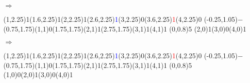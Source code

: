 \documentclass[11pt,a4paper]{article}
\begin{document}
\begin{center}
\begin{table}[ht!]
\begin{minipage}{0.15\textwidth}
  \end{minipage}
  \hfillx
  \begin{minipage}{0.1\textwidth}
  \centering

$ \Rightarrow $

  \end{minipage}
  \hfillx
  \begin{minipage}{0.15\textwidth}

\par\vspace{3\oplineheight}
\oplput(1,2.25){1}\oplput(1.6,2.25){\scriptsize \textcolor{green(htmlcssgreen)}{1}}\oplput(2,2.25){1}\oplput(2.6,2.25){\scriptsize \textcolor{blue}{1}}\oplput(3,2.25){0}\oplput(3.6,2.25){\scriptsize \textcolor{red}{1}}\oplput(4,2.25){0}
\oplput(-0.25,1.05){$-$}
\oplput(0.75,1.75){\tiny \textcolor{green(htmlcssgreen)}{}}\oplput(1,1){0}\oplput(1.75,1.75){\tiny \textcolor{blue}{}}\oplput(2,1){1}\oplput(2.75,1.75){\tiny \textcolor{red}{}}\oplput(3,1){1}\oplput(4,1){1}
\ophline(0,0.8){5}
\oplput(2,0){1}\oplput(3,0){0}\oplput(4,0){1}

  \end{minipage}
  \hfillx
  \begin{minipage}{0.1\textwidth}
  \centering

$ \Rightarrow $

  \end{minipage}
  \hfillx
  \begin{minipage}{0.15\textwidth}

\par\vspace{3\oplineheight}
\oplput(1,2.25){1}\oplput(1.6,2.25){\scriptsize \textcolor{green(htmlcssgreen)}{1}}\oplput(2,2.25){1}\oplput(2.6,2.25){\scriptsize \textcolor{blue}{1}}\oplput(3,2.25){0}\oplput(3.6,2.25){\scriptsize \textcolor{red}{1}}\oplput(4,2.25){0}
\oplput(-0.25,1.05){$-$}
\oplput(0.75,1.75){\tiny \textcolor{green(htmlcssgreen)}{}}\oplput(1,1){0}\oplput(1.75,1.75){\tiny \textcolor{blue}{}}\oplput(2,1){1}\oplput(2.75,1.75){\tiny \textcolor{red}{}}\oplput(3,1){1}\oplput(4,1){1}
\ophline(0,0.8){5}
\oplput(1,0){0}\oplput(2,0){1}\oplput(3,0){0}\oplput(4,0){1}

  \end{minipage}
\end{table}

\end{center}
\end{document}
